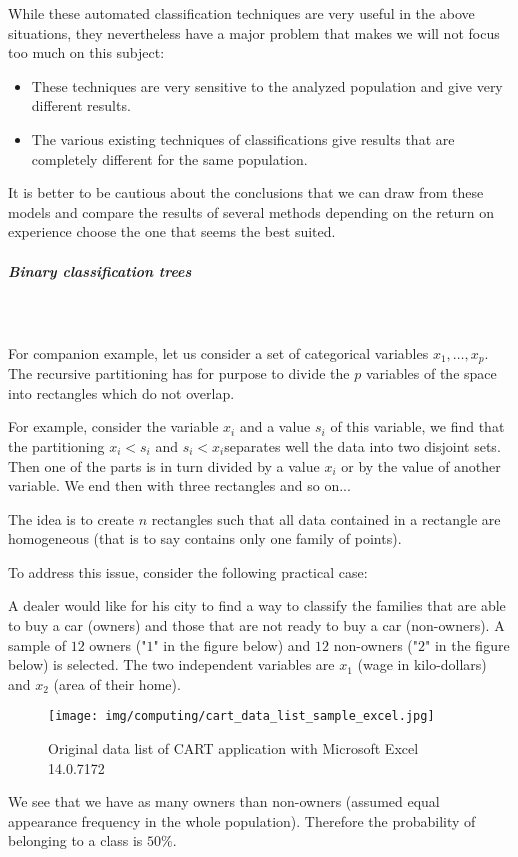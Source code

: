 	While these automated  classification techniques are very useful in the above situations, they nevertheless have a major problem that makes we will not focus too much on this subject:
	\begin{itemize}
		\item These techniques are very sensitive to the analyzed population and give very different results.

		\item The various existing  techniques of classifications give results that are completely different for the same population.
	\end{itemize}
	It is better to be cautious about the conclusions that we can draw from these models and compare the results of several methods depending on the return on experience choose the one that seems the best suited.

	\subparagraph{Binary classification trees}\mbox{}\\\\
	For companion example, let us consider a set of categorical variables $x_1,\ldots,x_p$. The recursive partitioning has for purpose to divide the $p$ variables of the space into rectangles which do not overlap.
	
	For example, consider the variable $x_i$ and a value $s_i$ of this variable, we find that the partitioning $x_i<s_i$ and $s_i<x_i$separates well the data into two disjoint sets. Then one of the parts is in turn divided by a value $x_i$ or by the value of another variable. We end then with three rectangles and so on...
	
	The idea is to create $n$ rectangles such that all data contained in a rectangle are homogeneous (that is to say contains only one family of points).

	To address this issue, consider the following practical case:
	
	A dealer would like for his city to find a way to classify the families that are able to buy a car (owners) and those that are not ready to buy a car (non-owners). A sample of $12$ owners ("$1$" in the figure below) and $12$ non-owners ("$2$" in the figure below) is selected. The two independent variables are $x_1$ (wage in kilo-dollars) and $x_2$ (area of their home).
	
	\begin{figure}[H]
		\centering
		\texttt{[image: img/computing/cart\_data\_list\_sample\_excel.jpg]}
		\caption[]{Original data list of CART application with Microsoft Excel 14.0.7172}
	\end{figure}
	We see that we have as many owners than non-owners (assumed equal appearance frequency in the whole population). Therefore the probability of belonging to a class is $50\%$.

